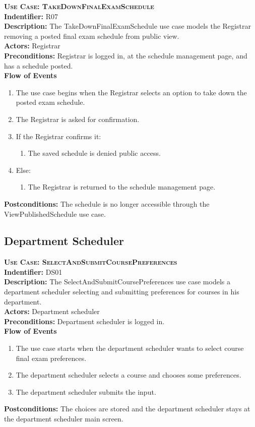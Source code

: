 \documentclass[11pt]{article}
\newcounter{id}
\newenvironment{usecase}{%
	\def\title##1{ {\large \bfseries  \scshape {Use Case:} ##1} \\ }
 	\def\id##1{{\bf Indentifier:} ##1\\}
	\def\des##1{ {\bf Description:} ##1\\}
	\def\actors##1{ {\bf Actors:} ##1\\}
    	\def\pre##1{ {\bf Preconditions:} ##1 \\} %
    	\def\flow##1{ {\bf Flow of Events} ##1}%
    	\newenvironment{ucenum}{%
        	\begin{enumerate}[nolistsep]\small}%
        	{\end{enumerate}}
	\def\post##1{ {\bf Postconditions:} ##1 \\}
}{\vspace{.05in}}
\begin{document}
\begin{usecase}
  \title{TakeDownFinalExamSchedule}
  \id{R07}
  \des{The TakeDownFinalExamSchedule use case models the Registrar removing a posted final exam schedule from public view.}
  \actors{Registrar}
  \pre{Registrar is logged in, at the schedule management page, and has a schedule posted.}
  \flow{}
  \begin{ucenum}
  \item The use case begins when the Registrar selects an option to take down the posted exam schedule.
  \item The Registrar is asked for confirmation.
  \item If the Registrar confirms it:
    \begin{ucenum} \item The saved schedule is denied public access. \end{ucenum}
  \item Else:
    \begin{ucenum} \item The Registrar is returned to the schedule management page. \end{ucenum}
  \end{ucenum}
  \post{The schedule is no longer accessible through the ViewPublishedSchedule use case.}
\end{usecase}

\subsection{Department Scheduler}
\begin{usecase}
  \title{SelectAndSubmitCoursePreferences}
  \id{DS01}
  \des{The SelectAndSubmitCoursePreferences use case models a department scheduler selecting and submitting preferences for courses in his department.}
  \actors{Department scheduler}
  \pre{Department scheduler is logged in.}
  \flow{}
  \begin{ucenum}
  \item The use case starts when the department scheduler wants to select course final exam preferences.
  \item The department scheduler selects a course and chooses some preferences.
  \item The department scheduler submits the input.
  \end{ucenum}
  \post{The choices are stored and the department scheduler stays at the department scheduler main screen.}
\end{usecase}
\end{document}
